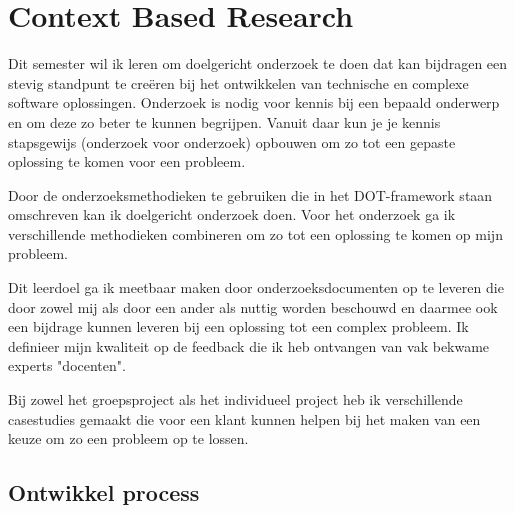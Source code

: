 
\section{Context Based Research}\label{sec:context-based-research}


Dit semester wil ik leren om doelgericht onderzoek te doen dat kan bijdragen een stevig
standpunt te creëren bij het ontwikkelen van technische en complexe software oplossingen.
Onderzoek is nodig voor kennis bij een bepaald onderwerp en om deze zo beter te kunnen begrijpen.
Vanuit daar kun je je kennis stapsgewijs (onderzoek voor onderzoek) opbouwen om zo tot een gepaste oplossing te
komen voor een probleem.


Door de onderzoeksmethodieken te gebruiken die in het DOT-framework staan omschreven kan ik doelgericht onderzoek
doen.
Voor het onderzoek ga ik verschillende methodieken combineren om zo tot een oplossing te komen op mijn probleem.


Dit leerdoel ga ik meetbaar maken door onderzoeksdocumenten op te leveren die door zowel mij als door een ander als
nuttig worden beschouwd en daarmee ook een bijdrage kunnen leveren bij een oplossing tot een complex probleem.
Ik definieer mijn kwaliteit op de feedback die ik heb ontvangen van vak bekwame experts "docenten".

Bij zowel het groepsproject als het individueel project heb ik verschillende casestudies gemaakt die voor een klant
kunnen helpen bij het maken van een keuze om zo een probleem op te lossen.

\bigskip
\subsection{Ontwikkel process}
